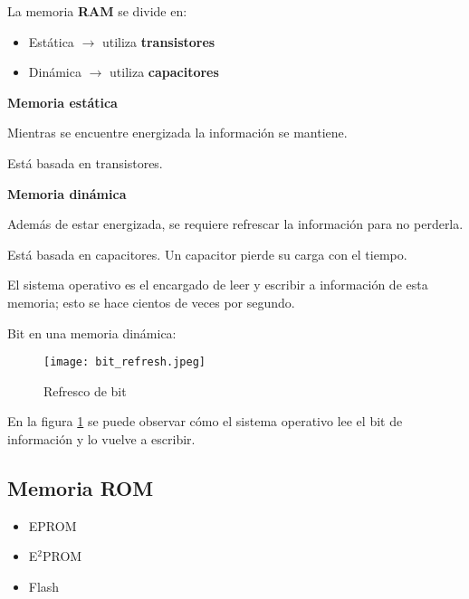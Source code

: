 \documentclass{article}
\begin{document}
La memoria \textbf{RAM} se divide en:

\begin{itemize}
	\item
		Estática $\rightarrow$ utiliza \textbf{transistores}
	\item
		Dinámica $\rightarrow$ utiliza \textbf{capacitores}
\end{itemize}

\vspace{1em}
\textbf{Memoria estática}

\vspace{1em}
Mientras se encuentre energizada la información se mantiene.

\vspace{1em}
Está basada en transistores.

\vspace{1em}
\textbf{Memoria dinámica}

\vspace{1em}
Además de estar energizada, se requiere refrescar la información para no perderla.

\vspace{1em}
Está basada en capacitores. Un capacitor pierde su carga con el tiempo.

\vspace{1em}
El sistema operativo es el encargado de leer y escribir a información de esta
memoria; esto se hace cientos de veces por segundo.

\vspace{1em}
Bit en una memoria dinámica:

\begin{figure}[h!]
	\texttt{[image: bit\_refresh.jpeg]}
	\caption{Refresco de bit}
	\label{fig:bit_refresh}
\end{figure}

En la figura \ref{fig:bit_refresh} se puede observar cómo el sistema operativo
lee el bit de información y lo vuelve a escribir.

\subsection{Memoria ROM}

\begin{itemize}
	\item
		EPROM
	\item
		E$^2$PROM
	\item
		Flash
\end{itemize}
\end{document}

